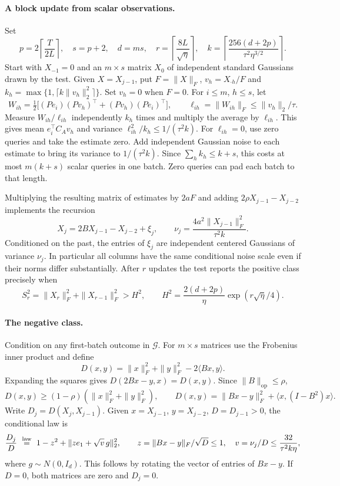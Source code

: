 \paragraph{A block update from scalar observations.}
Set
\[
 p=2\left\lceil\frac{T}{2L}\right\rceil,\quad s=p+2,\quad d=ms,\quad
 r=\left\lceil\frac{8L}{\sqrt\eta}\right\rceil,\quad
 k=\left\lceil\frac{256(d+2p)}{\tau^2\eta^{3/2}}\right\rceil .
\]
Start with \(X_{-1}=0\) and an \(m\times s\) matrix \(X_0\) of independent standard Gaussians drawn by the test. Given \(X=X_{j-1}\), put \(F=\|X\|_F\), \(v_h=X_{\cdot h}/F\) and \(k_h=\max\{1,\lceil k\|v_h\|_2^2\rceil\}\). Set \(v_h=0\) when \(F=0\). For \(i\le m\), \(h\le s\), let
\[
 W_{ih}=\tfrac12\big[(Pe_i)(Pv_h)^\top+(Pv_h)(Pe_i)^\top\big],
 \qquad \ell_{ih}=\|W_{ih}\|_F\le\|v_h\|_2/\tau .
\]
Measure \(W_{ih}/\ell_{ih}\) independently \(k_h\) times and multiply the average by \(\ell_{ih}\). This gives mean \(e_i^\top C_A v_h\) and variance \(\ell_{ih}^2/k_h\le1/(\tau^2k)\). For \(\ell_{ih}=0\), use zero queries and take the estimate zero. Add independent Gaussian noise to each estimate to bring its variance to \(1/(\tau^2k)\). Since \(\sum_h k_h\le k+s\), this costs at most \(m(k+s)\) scalar queries in one batch. Zero queries can pad each batch to that length.

Multiplying the resulting matrix of estimates by \(2aF\) and adding \(2\rho X_{j-1}-X_{j-2}\) implements the recursion
\begin{equation}\label{eq:upper-recurrence}
 X_j=2BX_{j-1}-X_{j-2}+\xi_j,\qquad
 \nu_j=\frac{4a^2\|X_{j-1}\|_F^2}{\tau^2 k}.
\end{equation}
Conditioned on the past, the entries of \(\xi_j\) are independent centered Gaussians of variance \(\nu_j\). In particular all columns have the same conditional noise scale even if their norms differ substantially. After \(r\) updates the test reports the positive class precisely when
\[
 S_r^2=\|X_r\|_F^2+\|X_{r-1}\|_F^2>H^2,\qquad
 H^2=\frac{2(d+2p)}{\eta}\exp(r\sqrt\eta/4).
\]

\paragraph{The negative class.}
Condition on any first-batch outcome in \(\mathcal G\). For \(m\times s\) matrices use the Frobenius inner product and define
\[
 D(x,y)=\|x\|_F^2+\|y\|_F^2-2\langle Bx,y\rangle .
\]
Expanding the squares gives \(D(2Bx-y,x)=D(x,y)\). Since \(\|B\|_{\mathrm{op}}\le\rho\),
\[
 D(x,y)\ge(1-\rho)(\|x\|_F^2+\|y\|_F^2),\qquad
 D(x,y)=\|Bx-y\|_F^2+\langle x,(I-B^2)x\rangle .
\]
Write \(D_j=D(X_j,X_{j-1})\). Given \(x=X_{j-1}\), \(y=X_{j-2}\), \(D=D_{j-1}>0\), the conditional law is
\[
 \frac{D_j}{D}\ \stackrel{\rm law}{=}\ 
 1-z^2+\|z e_1+\sqrt v\,g\|_2^2,\qquad
 z=\|Bx-y\|_F/\sqrt D\le 1,\quad
 v=\nu_j/D\le \frac{32}{\tau^2 k\eta},
\]
where \(g\sim N(0,I_d)\). This follows by rotating the vector of entries of \(Bx-y\). If \(D=0\), both matrices are zero and \(D_j=0\).

